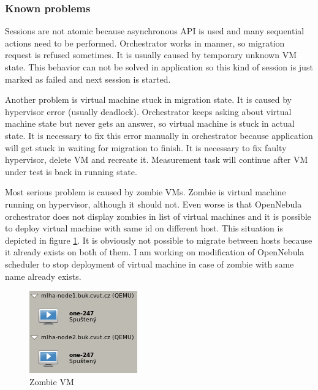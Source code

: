 \subsubsection{Known problems}

Sessions are not atomic because asynchronous \Ac{API} is used and many sequential actions need to be performed. Orchestrator works in  manner, so migration request is refused sometimes. It is usually caused by temporary unknown \Ac{VM} state. This behavior can not be solved in application so this kind of session is just marked as failed and next session is started. 

Another problem is virtual machine stuck in migration state. It is caused by hypervisor error (usually deadlock). Orchestrator keeps asking about virtual machine state but never gets an answer, so virtual machine is stuck in actual state. It is necessary to fix this error manually in orchestrator because application will get stuck in waiting for migration to finish. It is necessary to fix faulty hypervisor, delete \Ac{VM} and recreate it.
Measurement task will continue after \Ac{VM} under test is back in running state.

Most serious problem is caused by zombie \Ac{VM}s. Zombie is virtual machine running on hypervisor, although it should not. Even worse is that OpenNebula orchestrator does not display zombies in list of virtual machines and it is possible to deploy virtual machine with same id on different host. This situation is depicted in figure \ref{img:themis-zombie}. It is obviously not possible to migrate  between hosts because it already exists on both of them. I am working on modification of OpenNebula scheduler to stop deployment of virtual machine in case of zombie with same name already exists.

\begin{figure}[htb]
	\begin{center}
	\includegraphics[scale=0.8]{zombie.png}
	\end{center}
	\caption{Zombie \Ac{VM}}
	\label{img:themis-zombie}
\end{figure}

